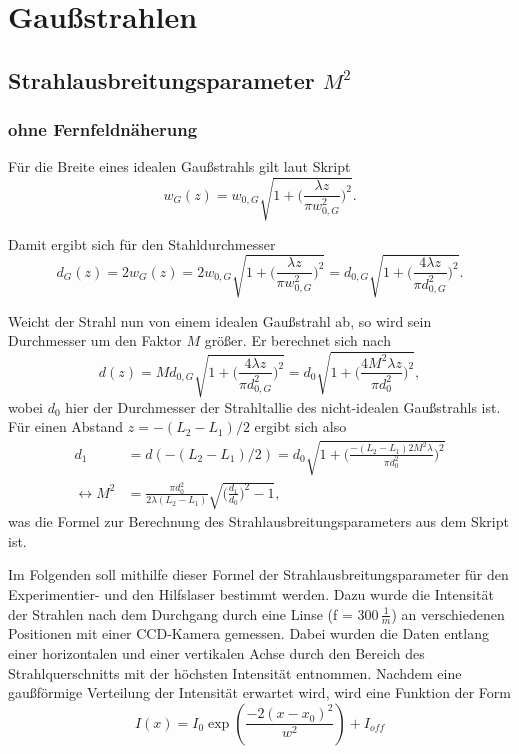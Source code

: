 
\section{Gaußstrahlen}
\label{sec:gauss}

\subsection{Strahlausbreitungsparameter $M^2$}
\subsubsection*{ohne Fernfeldnäherung}

Für die Breite eines idealen Gaußstrahls gilt laut Skript 
\begin{equation*}
    w_G(z) = w_{0,G} \sqrt{1 + \biggl(\frac{\lambda z}{\pi w_{0,G}^2}\biggl)^2}.
\end{equation*}

Damit ergibt sich für den Stahldurchmesser 
\begin{equation*}
    d_G(z) = 2 w_G(z) = 2 w_{0,G} \sqrt{1 + \biggl(\frac{\lambda z}{\pi w_{0,G}^2}\biggl)^2} = d_{0,G} \sqrt{1 + \biggl(\frac{4\lambda z}{\pi d_{0,G}^2}\biggl)^2}.
\end{equation*}

Weicht der Strahl nun von einem idealen Gaußstrahl ab, so wird sein Durchmesser um den Faktor $M$ größer. Er berechnet sich nach
\begin{equation*}
    d(z) = M d_{0,G} \sqrt{1 + \biggl(\frac{4\lambda z}{\pi d_{0,G}^2}\biggl)^2} = d_0 \sqrt{1 +\biggl (\frac{4M^2\lambda z}{\pi d_0^2}\biggl)^2},
\end{equation*}
wobei $d_0$ hier der Durchmesser der Strahltallie des nicht-idealen Gaußstrahls ist.
Für einen Abstand $z = -(L_2-L_1)/2$ ergibt sich also
\begin{align}
    d_1 &= d(-(L_2-L_1)/2) = d_0 \sqrt{1 +\biggl (\frac{-(L_2-L_1)2M^2\lambda}{\pi d_0^2}\biggl)^2} \nonumber \\
    \leftrightarrow M^2 &= \frac{\pi d_0^2}{2 \lambda (L_2-L_1) } \sqrt{\biggl(\frac{d_1}{d_0}\biggl)^2-1},
    \label{eq:M}
\end{align}
was die Formel zur Berechnung des Strahlausbreitungsparameters aus dem Skript ist.

Im Folgenden soll mithilfe dieser Formel der Strahlausbreitungsparameter für den Experimentier- und den Hilfslaser bestimmt werden. Dazu wurde die Intensität der Strahlen 
nach dem Durchgang durch eine Linse (f = 300\,$\frac{1}{m}$) an verschiedenen Positionen mit einer CCD-Kamera gemessen. Dabei wurden die Daten entlang einer horizontalen und 
einer vertikalen Achse durch den Bereich des Strahlquerschnitts mit der höchsten Intensität entnommen. Nachdem eine gaußförmige Verteilung der Intensität erwartet wird, wird 
eine Funktion der Form 
\begin{equation*}
    I(x) = I_0 \exp(\frac{-2(x-x_0)^2}{w^2}) + I_{off}
\end{equation*}

